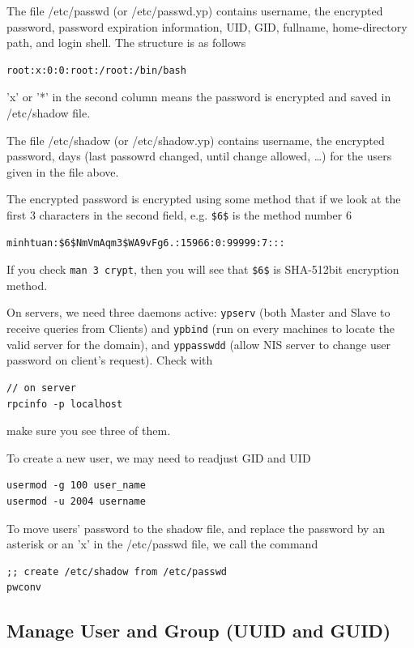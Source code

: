 \begin{framed}

  The file /etc/passwd (or /etc/passwd.yp) contains username, the encrypted
  password, password expiration information, UID, GID, fullname, home-directory path, and login
shell. The structure is as follows
\begin{verbatim}
root:x:0:0:root:/root:/bin/bash
\end{verbatim}
'x' or '*' in the second column means the password is encrypted and saved in
/etc/shadow file.

The file /etc/shadow (or /etc/shadow.yp) contains username, the encrypted
password, days (last passowrd changed, until change allowed, \ldots) for the
users given in the file above. 
\end{framed}

The encrypted password is encrypted using some method that if we look at the
first 3 characters in the second field, e.g. \verb!$6$! is the method number 6
\begin{verbatim}
minhtuan:$6$NmVmAqm3$WA9vFg6.:15966:0:99999:7:::
\end{verbatim}
If you check \verb!man 3 crypt!, then you will see that \verb!$6$! is SHA-512bit
encryption method.


On servers, we need three daemons active: \verb!ypserv! (both Master and Slave
to receive queries from Clients) and \verb!ypbind! (run on every machines to
locate the valid server for the domain), and \verb!yppasswdd! (allow NIS server
to change user password on client's request). Check with 
\begin{verbatim}
// on server
rpcinfo -p localhost
\end{verbatim}
make sure you see three of them.

To create a new user, we may need to readjust GID and UID
\begin{verbatim}
usermod -g 100 user_name
usermod -u 2004 username
\end{verbatim}

To move users' password to the shadow file, and replace the password by an
asterisk or an 'x' in the /etc/passwd file, we call the command
\begin{verbatim}
;; create /etc/shadow from /etc/passwd
pwconv  
\end{verbatim}

\subsection{Manage User and Group (UUID and GUID)}
\label{sec:UUID_GUID}

